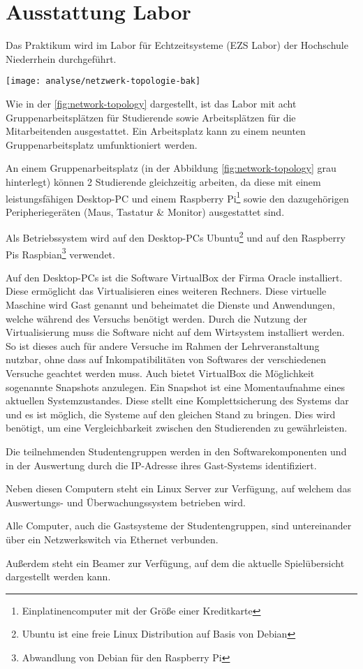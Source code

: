 \section{Ausstattung Labor}
\label{sec:Ausstattung_Labor}

Das Praktikum wird im Labor für Echtzeitsysteme (EZS Labor) der Hochschule Niederrhein durchgeführt.

\begin{center}
	\texttt{[image: analyse/netzwerk-topologie-bak]}
	\label{fig:network-topology}
\end{center}

Wie in der \autoref{fig:network-topology} dargestellt, ist das Labor mit acht Gruppenarbeitsplätzen für Studierende sowie Arbeitsplätzen für die Mitarbeitenden ausgestattet. Ein Arbeitsplatz kann zu einem neunten Gruppenarbeitsplatz umfunktioniert werden.

An einem Gruppenarbeitsplatz (in der Abbildung \ref{fig:network-topology} grau hinterlegt) können 2 Studierende gleichzeitig arbeiten, da diese mit einem leistungsfähigen Desktop-PC und einem Raspberry Pi\footnote{Einplatinencomputer mit der Größe einer Kreditkarte} sowie den dazugehörigen Peripheriegeräten (Maus, Tastatur \& Monitor) ausgestattet sind.

Als Betriebssystem wird auf den Desktop-PCs Ubuntu\footnote{Ubuntu ist eine freie Linux Distribution auf Basis von Debian} und auf den Raspberry Pis Raspbian\footnote{Abwandlung von Debian für den Raspberry Pi} verwendet.

Auf den Desktop-PCs ist die Software VirtualBox der Firma Oracle installiert. Diese ermöglicht das Virtualisieren eines weiteren Rechners. Diese virtuelle Maschine wird Gast genannt und beheimatet die Dienste und Anwendungen, welche während des Versuchs benötigt werden. Durch die Nutzung der Virtualisierung muss die Software nicht auf dem Wirtsystem installiert werden. So ist dieses auch für andere Versuche im Rahmen der Lehrveranstaltung nutzbar, ohne dass auf Inkompatibilitäten von Softwares der verschiedenen Versuche geachtet werden muss. Auch bietet VirtualBox die Möglichkeit sogenannte Snapshots anzulegen. Ein Snapshot ist eine Momentaufnahme eines aktuellen Systemzustandes. Diese stellt eine Komplettsicherung des Systems dar und es ist möglich, die Systeme auf den gleichen Stand zu bringen. \cite{oraclecorporationOracleVMVirtualBox2020} Dies wird benötigt, um eine Vergleichbarkeit zwischen den Studierenden zu gewährleisten.

Die teilnehmenden Studentengruppen werden in den Softwarekomponenten und in der Auswertung durch die IP-Adresse ihres Gast-Systems identifiziert.

Neben diesen Computern steht ein Linux Server zur Verfügung, auf welchem das \linebreak
Auswertungs- und Überwachungssystem betrieben wird.

Alle Computer, auch die Gastsysteme der Studentengruppen, sind untereinander über ein Netzwerkswitch via Ethernet verbunden.

Außerdem steht ein Beamer zur Verfügung, auf dem die aktuelle Spielübersicht dargestellt werden kann.